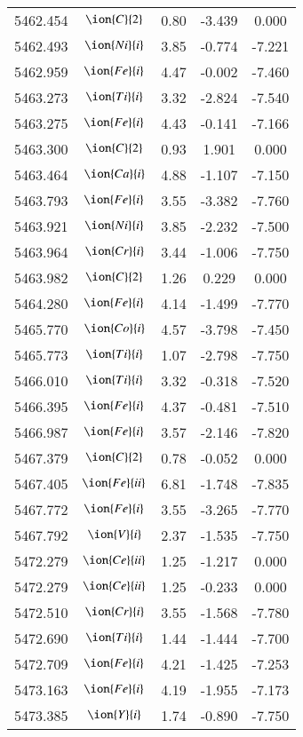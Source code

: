 \documentclass[fleqn,usenatbib]{mnras}
\begin{document}
\begin{center}
\begin{table}
\begin{tabular}{ccccc}
5462.454 &  $\ion{C}{2}$ & 0.80 & -3.439 & 0.000 \\ 
5462.493 &  $\ion{Ni}{i}$  & 3.85 & -0.774 & -7.221 \\ 
5462.959 &  $\ion{Fe}{i}$  & 4.47 & -0.002 & -7.460 \\ 
5463.273 &  $\ion{Ti}{i}$  & 3.32 & -2.824 & -7.540 \\ 
5463.275 &  $\ion{Fe}{i}$  & 4.43 & -0.141 & -7.166 \\ 
5463.300 &  $\ion{C}{2}$ & 0.93 & 1.901 & 0.000 \\ 
5463.464 &  $\ion{Ca}{i}$  & 4.88 & -1.107 & -7.150 \\ 
5463.793 &  $\ion{Fe}{i}$  & 3.55 & -3.382 & -7.760 \\ 
5463.921 &  $\ion{Ni}{i}$  & 3.85 & -2.232 & -7.500 \\ 
5463.964 &  $\ion{Cr}{i}$  & 3.44 & -1.006 & -7.750 \\ 
5463.982 &  $\ion{C}{2}$ & 1.26 & 0.229 & 0.000 \\ 
5464.280 &  $\ion{Fe}{i}$  & 4.14 & -1.499 & -7.770 \\ 
5465.770 &  $\ion{Co}{i}$  & 4.57 & -3.798 & -7.450 \\ 
5465.773 &  $\ion{Ti}{i}$  & 1.07 & -2.798 & -7.750 \\ 
5466.010 &  $\ion{Ti}{i}$  & 3.32 & -0.318 & -7.520 \\ 
5466.395 &  $\ion{Fe}{i}$  & 4.37 & -0.481 & -7.510 \\ 
5466.987 &  $\ion{Fe}{i}$  & 3.57 & -2.146 & -7.820 \\ 
5467.379 &  $\ion{C}{2}$ & 0.78 & -0.052 & 0.000 \\ 
5467.405 &  $\ion{Fe}{ii}$  & 6.81 & -1.748 & -7.835 \\ 
5467.772 &  $\ion{Fe}{i}$  & 3.55 & -3.265 & -7.770 \\ 
5467.792 &  $\ion{V}{i}$  & 2.37 & -1.535 & -7.750 \\ 
5472.279 &  $\ion{Ce}{ii}$  & 1.25 & -1.217 & 0.000 \\ 
5472.279 &  $\ion{Ce}{ii}$  & 1.25 & -0.233 & 0.000 \\ 
5472.510 &  $\ion{Cr}{i}$  & 3.55 & -1.568 & -7.780 \\ 
5472.690 &  $\ion{Ti}{i}$  & 1.44 & -1.444 & -7.700 \\ 
5472.709 &  $\ion{Fe}{i}$  & 4.21 & -1.425 & -7.253 \\ 
5473.163 &  $\ion{Fe}{i}$  & 4.19 & -1.955 & -7.173 \\ 
5473.385 &  $\ion{Y}{i}$  & 1.74 & -0.890 & -7.750 \\ 

\end{tabular}
\end{table}
\end{center}
\end{document}
